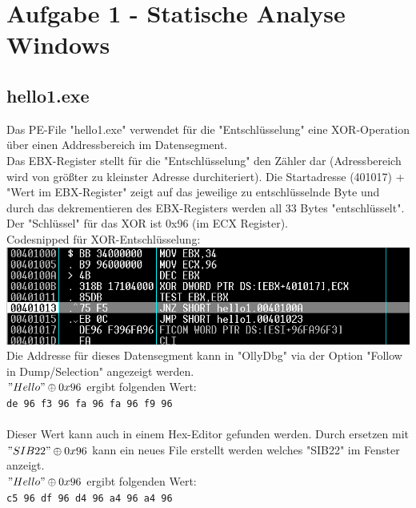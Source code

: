 \documentclass{article}
\begin{document}
	\pagebreak
	
	\section{Aufgabe 1 - Statische Analyse Windows}
	\subsection{hello1.exe}
	Das PE-File "hello1.exe" verwendet für die "Entschlüsselung" eine XOR-Operation über einen Addressbereich im Datensegment.\\
	Das EBX-Register stellt für die "Entschlüsselung" den Zähler dar (Adressbereich wird von größter zu kleinster Adresse durchiteriert). Die Startadresse (401017) + "Wert im EBX-Register" zeigt auf das jeweilige zu entschlüsselnde Byte und durch das dekrementieren des EBX-Registers werden all 33 Bytes "entschlüsselt".\\
	Der "Schlüssel" für das XOR ist 0x96 (im ECX Register).\\
	Codesnipped für XOR-Entschlüsselung:\\
	\includegraphics[width=0.5\linewidth]{pictures/hello1-important code-snipped}\\
	Die Addresse für dieses Datensegment kann in "OllyDbg" via der Option "Follow in Dump/Selection" angezeigt werden.\\
	\("Hello" \oplus 0x96\) ergibt folgenden Wert:\\
	\texttt{de 96 f3 96 fa 96 fa 96 f9 96}\\
	\\
	Dieser Wert kann auch in einem Hex-Editor gefunden werden. Durch ersetzen mit \("SIB22" \oplus 0x96\) kann ein neues File erstellt werden welches "SIB22" im Fenster anzeigt.\\
	\("Hello" \oplus 0x96\) ergibt folgenden Wert:\\
	\texttt{c5 96 df 96 d4 96 a4 96 a4 96}\\
	
\end{document}
